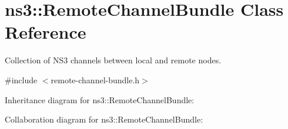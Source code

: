 \hypertarget{classns3_1_1RemoteChannelBundle}{}\section{ns3\+:\+:Remote\+Channel\+Bundle Class Reference}
\label{classns3_1_1RemoteChannelBundle}


Collection of N\+S3 channels between local and remote nodes.  




{\ttfamily \#include $<$remote-\/channel-\/bundle.\+h$>$}



Inheritance diagram for ns3\+:\+:Remote\+Channel\+Bundle\+:


Collaboration diagram for ns3\+:\+:Remote\+Channel\+Bundle\+:
